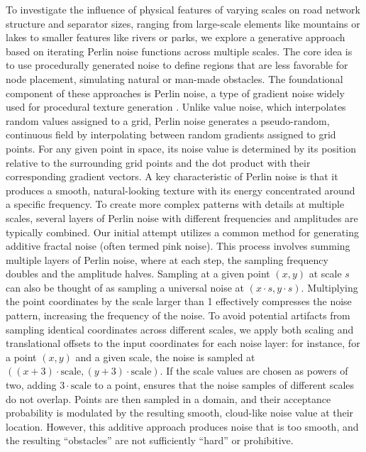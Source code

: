 To investigate the influence of physical features of varying scales on road network structure and separator sizes, ranging from large-scale elements like mountains or lakes to smaller features like rivers or parks, we explore a generative approach based on iterating Perlin noise functions across multiple scales.
The core idea is to use procedurally generated noise to define regions that are less favorable for node placement, simulating natural or man-made obstacles.
The foundational component of these approaches is Perlin noise, a type of gradient noise widely used for procedural texture generation \cite{perlin_image_1985}.
Unlike value noise, which interpolates random values assigned to a grid, Perlin noise generates a pseudo-random, continuous field by interpolating between random gradients assigned to grid points.
For any given point in space, its noise value is determined by its position relative to the surrounding grid points and the dot product with their corresponding gradient vectors.
A key characteristic of Perlin noise is that it produces a smooth, natural-looking texture with its energy concentrated around a specific frequency.
To create more complex patterns with details at multiple scales, several layers of Perlin noise with different frequencies and amplitudes are typically combined.
Our initial attempt utilizes a common method for generating additive fractal noise (often termed pink noise).
This process involves summing multiple layers of Perlin noise, where at each step, the sampling frequency doubles and the amplitude halves.
Sampling at a given point \((x,y)\) at scale \(s\) can also be thought of as sampling a universal noise at \((x \cdot s, y \cdot s)\).
Multiplying the point coordinates by the scale larger than 1 effectively compresses the noise pattern, increasing the frequency of the noise.
To avoid potential artifacts from sampling identical coordinates across different scales, we apply both scaling and translational offsets to the input coordinates for each noise layer: for instance, for a point \((x,y)\) and a given scale, the noise is sampled at \(((x + 3) \cdot \text{scale}, (y+3) \cdot \text{scale} )\).
If the scale values are chosen as powers of two, adding \(3 \cdot \text{scale}\) to a point, ensures that the noise samples of different scales do not overlap.
Points are then sampled in a domain, and their acceptance probability is modulated by the resulting smooth, cloud-like noise value at their location.
However, this additive approach produces noise that is too smooth, and the resulting \enquote{obstacles} are not sufficiently \enquote{hard} or prohibitive.
